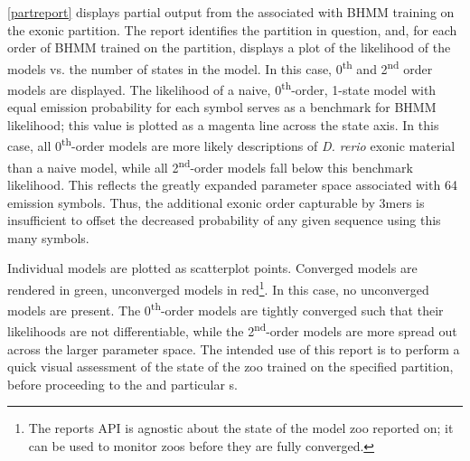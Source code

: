 \documentclass{ut-thesis}
\begin{document}
\begin{NoHyper}
\autoref{partreport} displays partial output from the  associated with BHMM training on the exonic partition. The report identifies the partition in question, and, for each order of BHMM trained on the partition, displays a plot of the likelihood of the models vs. the number of states in the model. In this case, 0\textsuperscript{th} and 2\textsuperscript{nd} order models are displayed. The likelihood of a naive, 0\textsuperscript{th}-order, 1-state model with equal emission probability for each symbol serves as a benchmark for BHMM likelihood; this value is plotted as a magenta line across the state axis. In this case, all 0\textsuperscript{th}-order models are more likely descriptions of \textit{D. rerio} exonic material than a naive model, while all 2\textsuperscript{nd}-order models fall below this benchmark likelihood. This reflects the greatly expanded parameter space associated with 64 emission symbols. Thus, the additional exonic order capturable by 3mers is insufficient to offset the decreased probability of any given sequence using this many symbols.

Individual models are plotted as scatterplot points. Converged models are rendered in green, unconverged models in red\footnote{The reports API is agnostic about the state of the model zoo reported on; it can be used to monitor zoos before they are fully converged.}. In this case, no unconverged models are present. The 0\textsuperscript{th}-order models are tightly converged such that their likelihoods are not differentiable, while the 2\textsuperscript{nd}-order models are more spread out across the larger parameter space. The intended use of this report is to perform a quick visual assessment of the state of the zoo trained on the specified partition, before proceeding to the  and particular s.


\end{NoHyper}
\end{document}
